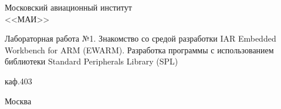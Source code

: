 \newpage
\thispagestyle{empty}

\begin{center}
\begin{Large}
Московский авиационный институт 
\\<<МАИ>>
\end{Large}
\end{center}
\vspace{18em}
\begin{center}
\begin{spacing}{2.0}
{\huge Лабораторная работа №1. Знакомство со средой разработки IAR Embedded Workbench for ARM (EWARM). Разработка программы с использованием библиотеки Standard Peripherals Library (SPL)}
\end{spacing}
\end{center}
\begin{center}
каф.403
\end{center}

\vspace{\fill}

\begin{center}
Москва \the\year
\end{center}
